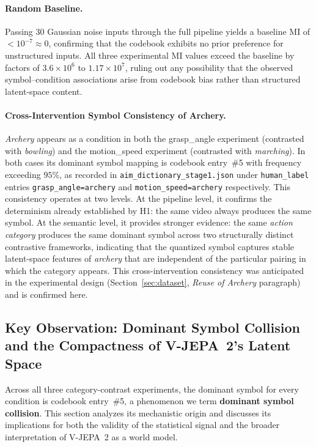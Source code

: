 \documentclass{article}
\begin{document}
\paragraph{Random Baseline.}
Passing 30 Gaussian noise inputs through the full pipeline yields a baseline
MI of $< 10^{-7} \approx 0$, confirming that the codebook exhibits no prior
preference for unstructured inputs.  All three experimental MI values exceed
the baseline by factors of $3.6 \times 10^{6}$ to $1.17 \times 10^{7}$,
ruling out any possibility that the observed symbol--condition associations
arise from codebook bias rather than structured latent-space content.

\paragraph{Cross-Intervention Symbol Consistency of Archery.}
\textit{Archery} appears as a condition in both the grasp\_angle
experiment (contrasted with \textit{bowling}) and the motion\_speed
experiment (contrasted with \textit{marching}).  In both cases its
dominant symbol mapping is codebook entry~\#5 with frequency exceeding
$95\%$, as recorded in \texttt{aim\_dictionary\_stage1.json} under
\texttt{human\_label} entries \texttt{grasp\_angle=archery} and
\texttt{motion\_speed=archery} respectively.
This consistency operates at two levels.  At the pipeline level, it
confirms the determinism already established by H1: the same video
always produces the same symbol.  At the semantic level, it provides
stronger evidence: the same \emph{action category} produces the same
dominant symbol across two structurally distinct contrastive frameworks,
indicating that the quantized symbol captures stable latent-space
features of \textit{archery} that are independent of the particular
pairing in which the category appears.  This cross-intervention
consistency was anticipated in the experimental design
(Section~\ref{sec:dataset}, \textit{Reuse of Archery} paragraph) and is confirmed here.

\subsection{Key Observation: Dominant Symbol Collision and the Compactness
            of V-JEPA~2's Latent Space}\label{sec:dominant_symbol}

Across all three category-contrast experiments, the dominant symbol for every
condition is codebook entry~\#5, a phenomenon we term \textbf{dominant symbol
collision}.  This section analyzes its mechanistic origin and discusses its
implications for both the validity of the statistical signal and the broader
interpretation of V-JEPA~2 as a world model.
\end{document}
